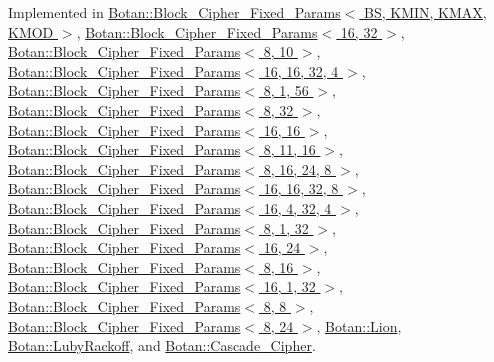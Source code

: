 Implemented in \hyperlink{classBotan_1_1Block__Cipher__Fixed__Params_a2827f84e563c3cabe7b337492fac46c6}{Botan\-::\-Block\-\_\-\-Cipher\-\_\-\-Fixed\-\_\-\-Params$<$ B\-S, K\-M\-I\-N, K\-M\-A\-X, K\-M\-O\-D $>$}, \hyperlink{classBotan_1_1Block__Cipher__Fixed__Params_a2827f84e563c3cabe7b337492fac46c6}{Botan\-::\-Block\-\_\-\-Cipher\-\_\-\-Fixed\-\_\-\-Params$<$ 16, 32 $>$}, \hyperlink{classBotan_1_1Block__Cipher__Fixed__Params_a2827f84e563c3cabe7b337492fac46c6}{Botan\-::\-Block\-\_\-\-Cipher\-\_\-\-Fixed\-\_\-\-Params$<$ 8, 10 $>$}, \hyperlink{classBotan_1_1Block__Cipher__Fixed__Params_a2827f84e563c3cabe7b337492fac46c6}{Botan\-::\-Block\-\_\-\-Cipher\-\_\-\-Fixed\-\_\-\-Params$<$ 16, 16, 32, 4 $>$}, \hyperlink{classBotan_1_1Block__Cipher__Fixed__Params_a2827f84e563c3cabe7b337492fac46c6}{Botan\-::\-Block\-\_\-\-Cipher\-\_\-\-Fixed\-\_\-\-Params$<$ 8, 1, 56 $>$}, \hyperlink{classBotan_1_1Block__Cipher__Fixed__Params_a2827f84e563c3cabe7b337492fac46c6}{Botan\-::\-Block\-\_\-\-Cipher\-\_\-\-Fixed\-\_\-\-Params$<$ 8, 32 $>$}, \hyperlink{classBotan_1_1Block__Cipher__Fixed__Params_a2827f84e563c3cabe7b337492fac46c6}{Botan\-::\-Block\-\_\-\-Cipher\-\_\-\-Fixed\-\_\-\-Params$<$ 16, 16 $>$}, \hyperlink{classBotan_1_1Block__Cipher__Fixed__Params_a2827f84e563c3cabe7b337492fac46c6}{Botan\-::\-Block\-\_\-\-Cipher\-\_\-\-Fixed\-\_\-\-Params$<$ 8, 11, 16 $>$}, \hyperlink{classBotan_1_1Block__Cipher__Fixed__Params_a2827f84e563c3cabe7b337492fac46c6}{Botan\-::\-Block\-\_\-\-Cipher\-\_\-\-Fixed\-\_\-\-Params$<$ 8, 16, 24, 8 $>$}, \hyperlink{classBotan_1_1Block__Cipher__Fixed__Params_a2827f84e563c3cabe7b337492fac46c6}{Botan\-::\-Block\-\_\-\-Cipher\-\_\-\-Fixed\-\_\-\-Params$<$ 16, 16, 32, 8 $>$}, \hyperlink{classBotan_1_1Block__Cipher__Fixed__Params_a2827f84e563c3cabe7b337492fac46c6}{Botan\-::\-Block\-\_\-\-Cipher\-\_\-\-Fixed\-\_\-\-Params$<$ 16, 4, 32, 4 $>$}, \hyperlink{classBotan_1_1Block__Cipher__Fixed__Params_a2827f84e563c3cabe7b337492fac46c6}{Botan\-::\-Block\-\_\-\-Cipher\-\_\-\-Fixed\-\_\-\-Params$<$ 8, 1, 32 $>$}, \hyperlink{classBotan_1_1Block__Cipher__Fixed__Params_a2827f84e563c3cabe7b337492fac46c6}{Botan\-::\-Block\-\_\-\-Cipher\-\_\-\-Fixed\-\_\-\-Params$<$ 16, 24 $>$}, \hyperlink{classBotan_1_1Block__Cipher__Fixed__Params_a2827f84e563c3cabe7b337492fac46c6}{Botan\-::\-Block\-\_\-\-Cipher\-\_\-\-Fixed\-\_\-\-Params$<$ 8, 16 $>$}, \hyperlink{classBotan_1_1Block__Cipher__Fixed__Params_a2827f84e563c3cabe7b337492fac46c6}{Botan\-::\-Block\-\_\-\-Cipher\-\_\-\-Fixed\-\_\-\-Params$<$ 16, 1, 32 $>$}, \hyperlink{classBotan_1_1Block__Cipher__Fixed__Params_a2827f84e563c3cabe7b337492fac46c6}{Botan\-::\-Block\-\_\-\-Cipher\-\_\-\-Fixed\-\_\-\-Params$<$ 8, 8 $>$}, \hyperlink{classBotan_1_1Block__Cipher__Fixed__Params_a2827f84e563c3cabe7b337492fac46c6}{Botan\-::\-Block\-\_\-\-Cipher\-\_\-\-Fixed\-\_\-\-Params$<$ 8, 24 $>$}, \hyperlink{classBotan_1_1Lion_ab7d58c2d256a6bdb3298ec1328c0b2df}{Botan\-::\-Lion}, \hyperlink{classBotan_1_1LubyRackoff_a324eae6f091ceb88926956079cd67976}{Botan\-::\-Luby\-Rackoff}, and \hyperlink{classBotan_1_1Cascade__Cipher_a5e6616c2a03c21732f1ac33ac4a2da34}{Botan\-::\-Cascade\-\_\-\-Cipher}.

